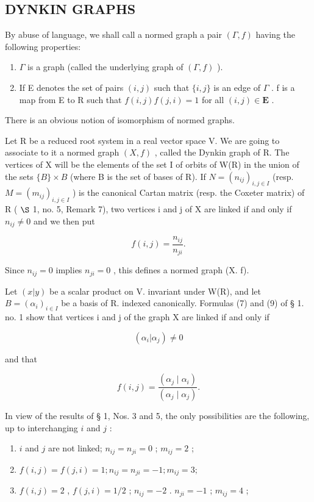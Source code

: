\subsection{DYNKIN GRAPHS}

By abuse of language, we shall call a normed graph a pair \((\Gamma, f)\) having the following properties:

\begin{enumerate}
\def\labelenumi{\arabic{enumi})}
\item
  \(\Gamma\) is a graph (called the underlying graph of \((\Gamma, f)\) ).
\item
  If E denotes the set of pairs \((i,j)\) such that \(\{i,j\}\) is an edge of \(\Gamma\) . f is a map from E to R such that \(f(i,j)f(j,i)=1\) for all \((i,j)\in\mathbf{E}\) .
\end{enumerate}

There is an obvious notion of isomorphism of normed graphs.

Let R be a reduced root system in a real vector space V. We are going to associate to it a normed graph \((X, f)\) , called the Dynkin graph of R. The vertices of X will be the elements of the set I of orbits of W(R) in the union of the sets \(\{B\} \times B\) (where B is the set of bases of R). If \(N = (n_{ij})_{i,j \in I}\) (resp. \(M = (m_{ij})_{i,j \in I}\) ) is the canonical Cartan matrix (resp. the Coxeter matrix) of R ( \(\S\) 1, no. 5, Remark 7), two vertices i and j of X are linked if and only if \(n_{ij} \neq 0\) and we then put

\[
f (i, j) = \frac {n _ {i j}}{n _ {j i}}.
\]

Since \(n_{ij} = 0\) implies \(n_{ji} = 0\) , this defines a normed graph (X. f).

Let \((x|y)\) be a scalar product on V. invariant under W(R), and let \(B = (\alpha_i)_{i \in I}\) be a basis of R. indexed canonically. Formulas (7) and (9) of § 1. no. 1 show that vertices i and j of the graph X are linked if and only if

\[
(\alpha_ {i} | \alpha_ {j}) \neq 0
\]

and that

\[
f (i, j) = \frac {\left(\alpha_ {j} \mid \alpha_ {i}\right)}{\left(\alpha_ {j} \mid \alpha_ {j}\right)}.
\]

In view of the results of § 1, Nos. 3 and 5, the only possibilities are the following, up to interchanging \(i\) and \(j\) :

\begin{enumerate}
\def\labelenumi{\arabic{enumi})}
\item
  \(i\) and \(j\) are not linked; \(n_{ij} = n_{ji} = 0\) ; \(m_{ij} = 2\) ;
\item
  \(f(i,j) = f(j,i) = 1; n_{ij} = n_{ji} = -1; m_{ij} = 3;\)
\item
  \(f(i,j) = 2\) , \(f(j,i) = 1/2\) ; \(n_{ij} = -2\) . \(n_{ji} = -1\) ; \(m_{ij} = 4\) ;
\end{enumerate}

